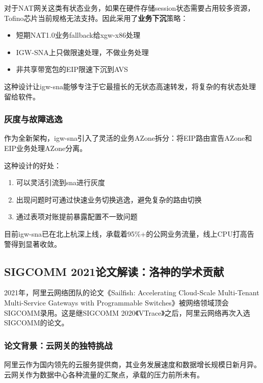 对于NAT网关这类有状态业务，如果在硬件存储session状态需要占用较多资源，Tofino芯片当前规格无法支持。因此采用了\textbf{业务下沉}策略：

\begin{itemize}
    \item 短期NAT1.0业务fallback给xgw-x86处理
    \item IGW-SNA上只做限速处理，不做业务处理
    \item 非共享带宽包的EIP限速下沉到AVS
\end{itemize}

这种设计让igw-sna能够专注于它最擅长的无状态高速转发，将复杂的有状态处理留给软件。

\subsubsection{灰度与故障逃逸}

作为全新架构，igw-sna引入了灵活的业务AZone拆分：将EIP路由宣告AZone和EIP业务处理AZone分离。

这种设计的好处：
\begin{enumerate}
    \item 可以灵活引流到sna进行灰度
    \item 出现问题时可通过快速业务切换逃逸，避免复杂的路由切换
    \item 通过表项对账提前暴露配置不一致问题
\end{enumerate}

目前igw-sna已在北上杭深上线，承载着95\%+的公网业务流量，线上CPU打高告警得到显著收敛。

\subsection{SIGCOMM 2021论文解读：洛神的学术贡献}

2021年，阿里云网络团队的论文《Sailfish: Accelerating Cloud-Scale Multi-Tenant Multi-Service Gateways with Programmable Switches》被网络领域顶会SIGCOMM录用。这是继SIGCOMM 2020《VTrace》之后，阿里云网络再次入选SIGCOMM的论文。

\subsubsection{论文背景：云网关的独特挑战}

阿里云作为国内领先的云服务提供商，其业务发展速度和数据增长规模日新月异。云网关作为数据中心各种流量的汇聚点，承载的压力前所未有。

